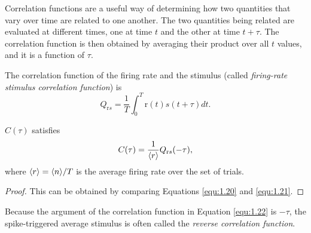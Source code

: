 \begin{rem}
  Correlation functions are a useful way of determining how two quantities that vary over time are related to one another. The two quantities being related are evaluated at different times, one at time $t$ and the other at time $t+\tau$. The correlation function is then obtained by averaging their product over all $t$ values, and it is a function of $\tau$.
\end{rem}

\begin{prop}
  \label{defn:Qrs}
  The correlation function of the firing rate and the stimulus (called \emph{firing-rate stimulus correlation function}) is
  \begin{equation}
    \label{equ:1.21}
    Q_{\text{r}s} = \frac{1}{T} \int_0^T \text{r}(t) s(t+\tau) dt.
  \end{equation}
\end{prop}

\begin{prop}
  \label{prop:rCF}
  $C(\tau)$ satisfies
  \begin{equation}
    \label{equ:1.22}
    C(\tau) = \frac{1}{\langle r \rangle} Q_{\text{r}s}(-\tau),
  \end{equation}
  where $\langle r \rangle = \langle n \rangle/T$ is the average firing rate over the set of trials.
\end{prop}
\begin{proof}
  This can be obtained by comparing Equations \ref{equ:1.20} and \ref{equ:1.21}.
\end{proof}

\begin{ntn}
  Because the argument of the correlation function in Equation \ref{equ:1.22} is $-\tau$, the spike-triggered average stimulus is often called the \emph{reverse correlation function}.
\end{ntn}

